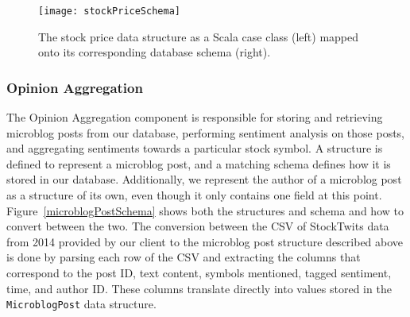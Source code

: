 \begin{figure}[h]
  \label{stockPriceSchema}
  \begin{center}
    \texttt{[image: stockPriceSchema]}
  \end{center}
  \caption{The stock price data structure as a Scala case class (left) mapped onto its corresponding database schema (right).}
\end{figure}

\subsubsection{Opinion Aggregation}

The Opinion Aggregation component is responsible for storing and retrieving microblog posts from our database, performing sentiment analysis on those posts, and aggregating sentiments towards a particular stock symbol.
A structure is defined to represent a microblog post, and a matching schema defines how it is stored in our database.
Additionally, we represent the author of a microblog post as a structure of its own, even though it only contains one field at this point.
Figure~\ref{microblogPostSchema} shows both the structures and schema and how to convert between the two.
The conversion between the CSV of StockTwits data from 2014 provided by our client to the microblog post structure described above is done by parsing each row of the CSV and extracting the columns that correspond to the post ID, text content, symbols mentioned, tagged sentiment, time, and author ID.
These columns translate directly into values stored in the \texttt{MicroblogPost} data structure.

